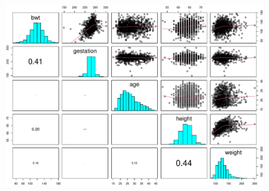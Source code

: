 \documentclass{beamer}\usepackage[]{graphicx}\usepackage[]{xcolor}
\makeatletter
\newenvironment{kframe}{%
 \def\at@end@of@kframe{}%
 \ifinner\ifhmode%
  \def\at@end@of@kframe{\end{minipage}}%
  \begin{minipage}{\columnwidth}%
 \fi\fi%
 \def\FrameCommand##1{\hskip\@totalleftmargin \hskip-\fboxsep
 \colorbox{shadecolor}{##1}\hskip-\fboxsep
     \hskip-\linewidth \hskip-\@totalleftmargin \hskip\columnwidth}%
 \MakeFramed {\advance\hsize-\width
   \@totalleftmargin\z@ \linewidth\hsize
   \@setminipage}}%
 {\par\unskip\endMakeFramed%
 \at@end@of@kframe}
\newenvironment{knitrout}{}{} %
\makeatother
\begin{document}
\begin{frame}[fragile]
\begin{knitrout}
\begin{kframe}
{\ttfamily\noindent\color{warningcolor}{Warning in par(usr): argument 1 does not name a graphical parameter}}\end{kframe}
\end{knitrout}
\begin{figure}
  \centering
  \includegraphics[scale = 0.45]{figure/RC-H10-002}
\end{figure}

\end{frame}
\end{document}
